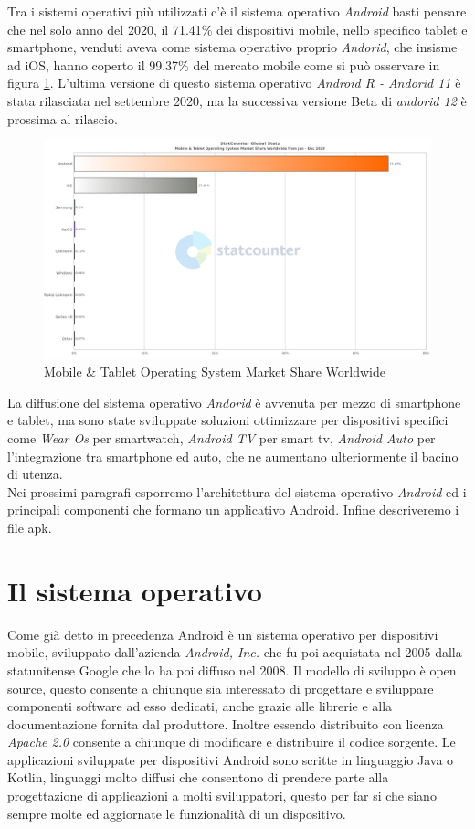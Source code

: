 Tra i sistemi operativi più utilizzati c'è il sistema operativo \textit{Android} basti pensare che nel solo anno del 2020, il 71.41\% dei dispositivi mobile, nello specifico tablet e smartphone, venduti aveva come sistema operativo proprio \textit{Andorid}, che insisme ad iOS, hanno coperto il 99.37\% del mercato mobile come si può osservare in figura \ref{fig:ww-sel}. L'ultima versione di questo sistema operativo \textit{Android R - Andorid 11} è stata rilasciata nel settembre 2020, ma la successiva versione Beta di \textit{andorid 12} è prossima al rilascio. 
\begin{figure}[h]
\centering 
\includegraphics[width=0.7\linewidth]{imgs/capitolo2/intro/StatCounter-os_combined-ww-monthly-202001-202012-bar.png}
\caption{Mobile \& Tablet Operating System Market Share Worldwide} 
\label{fig:ww-sel} 
\end{figure}
\FloatBarrier
 La diffusione del sistema operativo \textit{Andorid} è avvenuta per mezzo di smartphone e tablet, ma sono state sviluppate soluzioni ottimizzare per dispositivi specifici come \textit{Wear Os} per smartwatch, \textit{Android TV} per smart tv, \textit{Android Auto} per l'integrazione tra smartphone ed auto, che ne aumentano ulteriormente il bacino di utenza. 
\\
Nei prossimi paragrafi esporremo l'architettura del sistema operativo \textit{Android} ed i principali componenti che formano un applicativo Android. Infine descriveremo i file apk.  


\section{Il sistema operativo}
\label{sec:Il sistema operativo}
Come già detto in precedenza Android è un sistema operativo per dispositivi mobile, sviluppato dall'azienda \textit{Android, Inc.} che fu poi acquistata nel 2005 dalla statunitense Google che lo ha poi diffuso nel 2008. Il modello di sviluppo è open source, questo consente a chiunque sia interessato di progettare e sviluppare componenti software ad esso dedicati, anche grazie alle librerie e alla documentazione fornita dal produttore. Inoltre essendo distribuito con licenza \textit{Apache 2.0} consente a chiunque di modificare e distribuire il codice sorgente. Le applicazioni sviluppate per dispositivi Android sono scritte in linguaggio Java o Kotlin, linguaggi molto diffusi che consentono di prendere parte alla progettazione di applicazioni a molti sviluppatori, questo per far si che siano sempre molte ed aggiornate le funzionalità di un dispositivo. 


